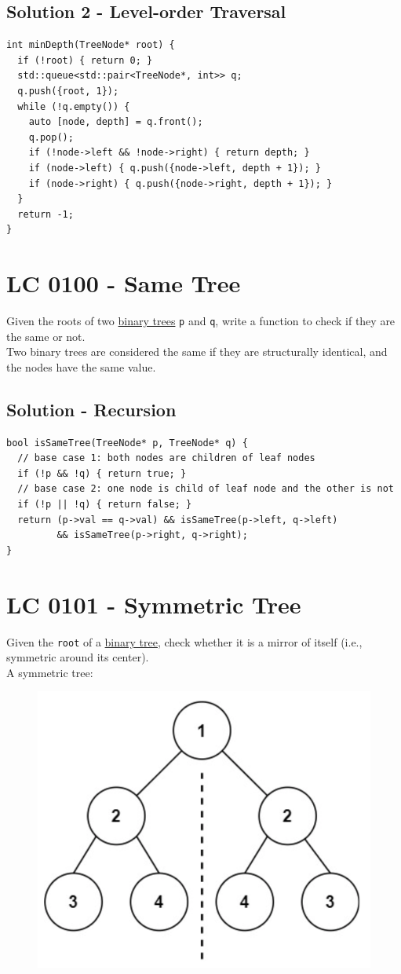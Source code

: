 \subsection*{Solution 2 - Level-order Traversal}
\begin{lstlisting}
int minDepth(TreeNode* root) {
  if (!root) { return 0; }
  std::queue<std::pair<TreeNode*, int>> q;
  q.push({root, 1});
  while (!q.empty()) {
    auto [node, depth] = q.front();
    q.pop();
    if (!node->left && !node->right) { return depth; }
    if (node->left) { q.push({node->left, depth + 1}); }
    if (node->right) { q.push({node->right, depth + 1}); }
  }
  return -1;
}
\end{lstlisting}

\section{LC 0100 - Same Tree}
Given the roots of two \ul{binary trees} {\colorbox{CodeBackground}{\lstinline|p|}} and {\colorbox{CodeBackground}{\lstinline|q|}}, write a function to check if they are the same or not.\\

Two binary trees are considered the same if they are structurally identical, and the nodes have the same value.

\subsection*{Solution - Recursion}
\begin{lstlisting}
bool isSameTree(TreeNode* p, TreeNode* q) {
  // base case 1: both nodes are children of leaf nodes
  if (!p && !q) { return true; }
  // base case 2: one node is child of leaf node and the other is not
  if (!p || !q) { return false; }
  return (p->val == q->val) && isSameTree(p->left, q->left)
         && isSameTree(p->right, q->right);
}
\end{lstlisting}

\section{LC 0101 - Symmetric Tree}
Given the {\colorbox{CodeBackground}{\lstinline|root|}} of a \ul{binary tree}, check whether it is a mirror of itself (i.e., symmetric around its center).\\

A symmetric tree:
\begin{figure}[H]
	\centering
	\includegraphics[width=0.25\linewidth]{images/lc0101_example}
	\label{fig:lc0101example}
\end{figure}

